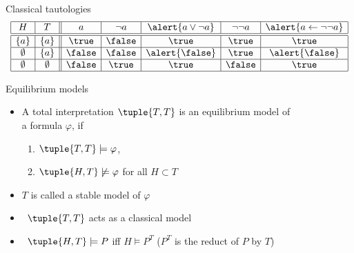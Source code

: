 \begin{frame}{Classical tautologies}
\centering
  \[
    \begin{array}{| c | c || c | c | c | c | c |}
      \hline
      H         & T          & a      & \neg a & \alert{a \vee \neg a} & \neg\neg a & \alert{a \leftarrow \neg\neg a}
      \\\hline\hline
      \{ a \}   & \{ a \}    & \true  & \false & \true                 & \true      & \true
      \\\hline
      \emptyset & \{ a \}    & \false & \false & \alert{\false}        & \true      & \alert{\false}
      \\\hline
      \emptyset & \emptyset  & \false & \true  & \true                 & \false     & \true
      \\\hline
    \end{array}
  \]
\end{frame}
\begin{frame}{Equilibrium models}
  \begin{itemize}
  \item A total interpretation $\tuple{T,T}$ is an \alert{equilibrium model}
    of\\ a formula $\varphi$,
    if
    \par
    \smallskip
    \begin{enumerate}\normalsize
    \item
      \(
      \tuple{T,T}\models\varphi
      \),
    \item
      \(
      \tuple{H,T}\not\models\varphi
      \)
      for all $H\subset T$
    \end{enumerate}
    \smallskip
  \item <2-> $T$ is called a \alert{stable model} of $\varphi$
    \bigskip
  \item<3->  \ $\tuple{T,T}$ acts as a classical model
    \smallskip
  \item<4->  \ $\tuple{H,T} \models P$ iff $H \models P^T$ \hfill ($P^T$ is the reduct of $P$ by $T$)
  \end{itemize}
\end{frame}
%

